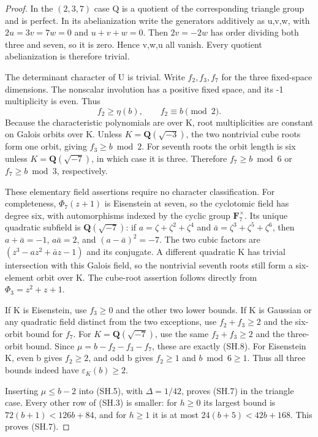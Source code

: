 \begin{proof}
In the \((2,3,7)\) case Q is a quotient of the corresponding
triangle group and is perfect. In its abelianization write the
generators additively as u,v,w, with \(2u=3v=7w=0\) and
\(u+v+w=0\). Then \(2v=-2w\) has order dividing both three
and seven, so it is zero. Hence v,w,u all vanish. Every quotient
abelianization is therefore trivial.

The determinant character of U is trivial. Write \(f_2,f_3,f_7\)
for the three fixed-space dimensions. The nonscalar involution has
a positive fixed space, and its -1 multiplicity is even. Thus
\[
                         f_2\ge\eta(b),\qquad f_2\equiv b\pmod2.
 \tag{SH.11}
\]
Because the characteristic polynomials are over K, root multiplicities
are constant on Galois orbits over K. Unless \(K=\mathbf Q(\sqrt{-3})\),
the two nontrivial cube roots form one orbit, giving
\(f_3\ge b\bmod2\). For seventh roots the orbit length is six
unless \(K=\mathbf Q(\sqrt{-7})\), in which case it is three.
Therefore \(f_7\ge b\bmod6\) or \(f_7\ge b\bmod3\), respectively.

These elementary field assertions require no character classification.
For completeness, \(\Phi_7(z+1)\) is Eisenstein at seven, so the
cyclotomic field has degree six, with automorphisms indexed by the
cyclic group \(\mathbf F_7^\times\). Its unique quadratic subfield
is \(\mathbf Q(\sqrt{-7})\): if
\(a=\zeta+\zeta^2+\zeta^4\) and
\(\bar a=\zeta^3+\zeta^5+\zeta^6\), then
\(a+\bar a=-1\), \(a\bar a=2\), and \((a-\bar a)^2=-7\).
The two cubic factors are
\((z^3-az^2+\bar a z-1)\) and its conjugate.
A different quadratic K has trivial intersection with this
Galois field, so the nontrivial seventh roots still form a six-element
orbit over K. The cube-root assertion follows directly from
\(\Phi_3=z^2+z+1\).

If K is Eisenstein, use \(f_3\ge0\) and the other two lower bounds.
If K is Gaussian or any quadratic field distinct from the two
exceptions, use \(f_2+f_3\ge2\) and the six-orbit bound for
\(f_7\). For \(K=\mathbf Q(\sqrt{-7})\), use the same
\(f_2+f_3\ge2\) and the three-orbit bound. Since
\(\mu=b-f_2-f_3-f_7\), these are exactly (SH.8).
For Eisenstein K, even b gives \(f_2\ge2\), and odd b gives
\(f_2\ge1\) and \(b\bmod6\ge1\). Thus all three bounds
indeed have \(\varepsilon_K(b)\ge2\).

Inserting \(\mu\le b-2\) into (SH.5), with
\(\Delta=1/42\), proves (SH.7) in the triangle case.
Every other row of (SH.3) is smaller: for \(h\ge0\) its
largest bound is \(72(b+1)<126b+84\), and for \(h\ge1\)
it is at most \(24(b+5)<42b+168\). This proves (SH.7).


\end{proof}
